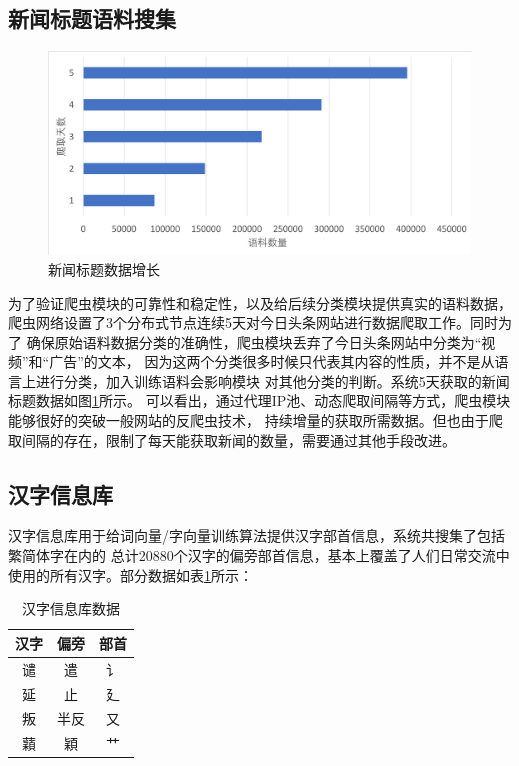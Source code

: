 \subsection{新闻标题语料搜集}
\begin{figure}[!hbp]
    \includegraphics[scale=0.5]{picture/spider_data.png}
    \caption{新闻标题数据增长}
    \label{spider_data_chart}
\end{figure}
为了验证爬虫模块的可靠性和稳定性，以及给后续分类模块提供真实的语料数据，
爬虫网络设置了3个分布式节点连续5天对今日头条网站进行数据爬取工作。同时为了
确保原始语料数据分类的准确性，爬虫模块丢弃了今日头条网站中分类为“视频”和“广告”的文本，
因为这两个分类很多时候只代表其内容的性质，并不是从语言上进行分类，加入训练语料会影响模块
对其他分类的判断。系统5天获取的新闻标题数据如图\ref{spider_data_chart}所示。
可以看出，通过代理IP池、动态爬取间隔等方式，爬虫模块能够很好的突破一般网站的反爬虫技术，
持续增量的获取所需数据。但也由于爬取间隔的存在，限制了每天能获取新闻的数量，需要通过其他手段改进。
\subsection{汉字信息库}
汉字信息库用于给词向量/字向量训练算法提供汉字部首信息，系统共搜集了包括繁简体字在内的
总计20880个汉字的偏旁部首信息，基本上覆盖了人们日常交流中使用的所有汉字。部分数据如表\ref{comp_table}所示：
\begin{table}[h]
    \caption{汉字信息库数据}
    \begin{tabular}{|c|c|c|}
        \hline
        汉字 & 偏旁 & 部首 \\
        \hline
        谴 & 遣 & 讠 \\
        \hline
        延 & 止 & 廴 \\
        \hline
        叛 & 半反 & 又 \\
        \hline
        蘔 & 穎 & 艹 \\
        \hline
    \end{tabular}
    \label{comp_table}
    \end{table}
